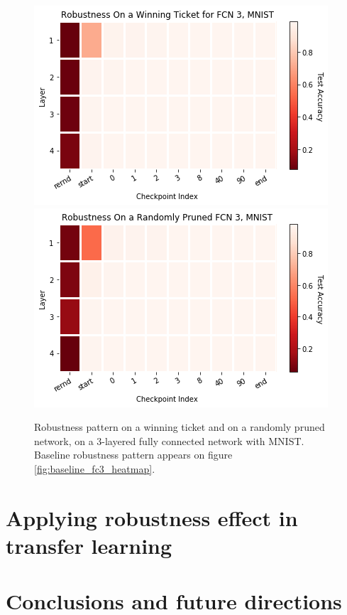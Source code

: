 \documentclass{article}
\begin{document}
\begin{figure}
  \includegraphics[width=\linewidth]{images/winning_ticket_robustness.png}
  \label{fig:winnery_robustness}
  \includegraphics[width=\linewidth]{images/random_pruned_fc3.png}
    \caption{Robustness pattern on a winning ticket and on a randomly pruned network, on a 3-layered fully connected network with MNIST. Baseline robustness pattern appears on figure \ref{fig:baseline_fc3_heatmap}.}
\end{figure}

\section{Applying robustness effect in transfer learning} \label{transfer}

\section{Conclusions and future directions} \label{conclusion}


\end{document}
